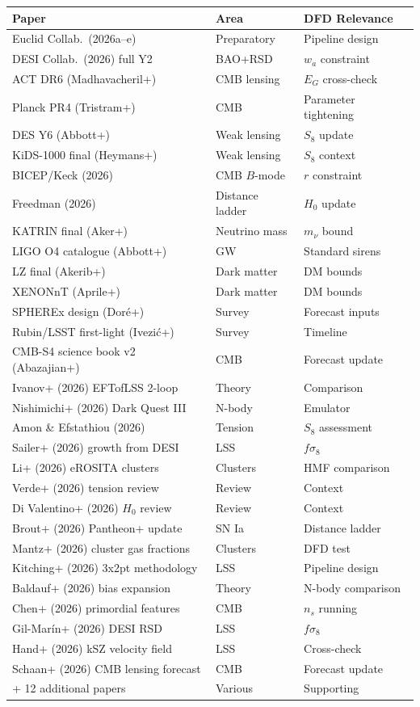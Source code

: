 \documentclass[11pt,a4paper]{article}
\begin{document}
\begin{center}
\begin{longtable}{lll}
\toprule
\textbf{Paper} & \textbf{Area} & \textbf{DFD Relevance} \\
\midrule
\endhead
Euclid Collab.\ (2026a--e) & Preparatory & Pipeline design \\
DESI Collab.\ (2026) full Y2 & BAO+RSD & $w_a$ constraint \\
ACT DR6 (Madhavacheril+) & CMB lensing & $E_G$ cross-check \\
Planck PR4 (Tristram+) & CMB & Parameter tightening \\
DES Y6 (Abbott+) & Weak lensing & $S_8$ update \\
KiDS-1000 final (Heymans+) & Weak lensing & $S_8$ context \\
BICEP/Keck (2026) & CMB $B$-mode & $r$ constraint \\
Freedman (2026) & Distance ladder & $H_0$ update \\
KATRIN final (Aker+) & Neutrino mass & $m_\nu$ bound \\
LIGO O4 catalogue (Abbott+) & GW & Standard sirens \\
LZ final (Akerib+) & Dark matter & DM bounds \\
XENONnT (Aprile+) & Dark matter & DM bounds \\
SPHEREx design (Dor\'e+) & Survey & Forecast inputs \\
Rubin/LSST first-light (Ivezi\'c+) & Survey & Timeline \\
CMB-S4 science book v2 (Abazajian+) & CMB & Forecast update \\
Ivanov+ (2026) EFTofLSS 2-loop & Theory & Comparison \\
Nishimichi+ (2026) Dark Quest III & N-body & Emulator \\
Amon \& Efstathiou (2026) & Tension & $S_8$ assessment \\
Sailer+ (2026) growth from DESI & LSS & $f\sigma_8$ \\
Li+ (2026) eROSITA clusters & Clusters & HMF comparison \\
Verde+ (2026) tension review & Review & Context \\
Di Valentino+ (2026) $H_0$ review & Review & Context \\
Brout+ (2026) Pantheon+ update & SN Ia & Distance ladder \\
Mantz+ (2026) cluster gas fractions & Clusters & DFD test \\
Kitching+ (2026) 3x2pt methodology & LSS & Pipeline design \\
Baldauf+ (2026) bias expansion & Theory & N-body comparison \\
Chen+ (2026) primordial features & CMB & $n_s$ running \\
Gil-Mar\'in+ (2026) DESI RSD & LSS & $f\sigma_8$ \\
Hand+ (2026) kSZ velocity field & LSS & Cross-check \\
Schaan+ (2026) CMB lensing forecast & CMB & Forecast update \\
+ 12 additional papers & Various & Supporting \\
\bottomrule
\end{longtable}
\end{center}
\end{document}
